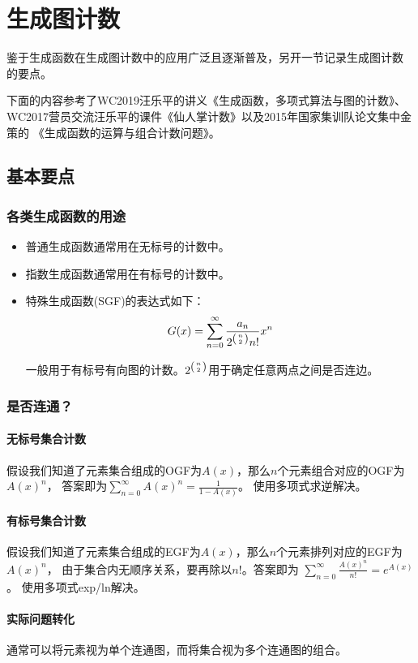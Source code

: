 \section{生成图计数}
鉴于生成函数在生成图计数中的应用广泛且逐渐普及，另开一节记录生成图计数
的要点。

下面的内容参考了WC2019汪乐平的讲义《生成函数，多项式算法与图的计数》、
WC2017营员交流汪乐平的课件《仙人掌计数》以及2015年国家集训队论文集中金策的
《生成函数的运算与组合计数问题》。
\subsection{基本要点}
\subsubsection{各类生成函数的用途}
\begin{itemize}
    \item 普通生成函数通常用在无标号的计数中。
    \item 指数生成函数通常用在有标号的计数中。
    \item 特殊生成函数(SGF)的表达式如下：
    \begin{displaymath}
        G(x)=\sum_{n=0}^\infty{\frac{a_n}{2^{\left(n \atop 2\right)}n!}x^n}
    \end{displaymath}

    一般用于有标号有向图的计数。$2^{\left(n \atop 2\right)}$用于确定任意两点之间是否连边。
\end{itemize}
\subsubsection{是否连通？}
\paragraph{无标号集合计数}
假设我们知道了元素集合组成的OGF为$A(x)$，那么$n$个元素组合对应的OGF为$A(x)^n$，
答案即为$\displaystyle \sum_{n=0}^\infty{A(x)^n}=\frac{1}{1-A(x)}$。
使用多项式求逆解决。
\paragraph{有标号集合计数}
假设我们知道了元素集合组成的EGF为$A(x)$，那么$n$个元素排列对应的EGF为$A(x)^n$，
由于集合内无顺序关系，要再除以$n!$。答案即为
$\displaystyle \sum_{n=0}^\infty{\frac{A(x)^n}{n!}}=e^{A(x)}$。
使用多项式exp/ln解决。
\paragraph{实际问题转化}
通常可以将元素视为单个连通图，而将集合视为多个连通图的组合。
